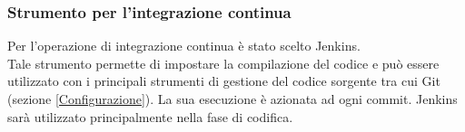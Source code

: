 \documentclass[../NormeDiProgetto.tex]{subfiles}
\begin{document}
			\subsubsection{Strumento per l'integrazione continua}\label{IntegrazioneContinua}
			Per l'operazione di integrazione continua è stato scelto Jenkins.\\
			Tale strumento permette di impostare la compilazione del codice e può essere utilizzato con
			i principali strumenti di gestione del codice sorgente tra cui Git (sezione
			\ref{Configurazione}).
			La sua esecuzione è azionata ad ogni commit.
			Jenkins sarà utilizzato principalmente nella fase di codifica.
\end{document}
